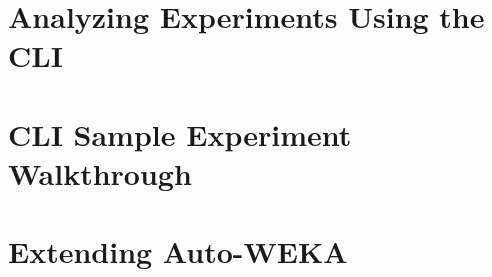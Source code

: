 \documentclass[11pt,letterpaper,oneside]{article}
\begin{document}
\section{Analyzing Experiments Using the CLI}\label{sec:analyzing}


\section{CLI Sample Experiment Walkthrough}\label{sec:analyzing}


\section{Extending Auto-WEKA}\label{sec:developercomments}

\end{document}

